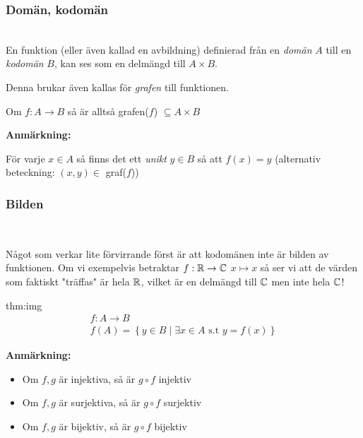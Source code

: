 \subsubsection{Domän, kodomän}\hfill\\
\noindent En funktion (eller även kallad en avbildning) definierad från en \textit{domän} $A$ till en \textit{kodomän} $B$, kan ses som en delmängd till $A\times B$.\par
\noindent Denna brukar även kallas för \textit{grafen} till funktionen.\par
\noindent Om $f:A\to B$ så är alltså grafen($f$) $\subseteq A\times B$ 
\par\bigskip
\noindent\textbf{Anmärkning:}\par
\noindent För varje $x\in A$ så finns det ett \textit{unikt} $y\in B$ så att $f(x) = y$ (alternativ beteckning: $(x,y)\in$ graf($f$))
\par\bigskip
\subsubsection{Bilden}\hfill\\\par
\noindent Något som verkar lite förvirrande först är att kodomänen inte är bilden av funktionen. Om vi exempelvis betraktar $f:\mathbb{R}\to\mathbb{C}$ $x\mapsto x$ så ser vi att de värden som faktiskt "träffas" är hela $\mathbb{R}$, vilket är en delmängd till $\mathbb{C}$ men inte hela $\mathbb{C}$!
\par\bigskip
\begin{theo}{thm:img}
  \begin{equation*}
    \begin{gathered}
      f:A\to B\\
      f(A) = \left\{y\in B\;|\;\exists x\in A\text{ s.t } y=f(x)\right\}
    \end{gathered}
  \end{equation*}
\end{theo}
\par\bigskip
\noindent\textbf{Anmärkning:}\par
\begin{itemize}
  \item Om $f,g$ är injektiva, så är $g\circ f$ injektiv
  \item Om $f,g$ är surjektiva, så är $g\circ f$ surjektiv 
  \item Om $f,g$ är bijektiv, så är $g\circ f$ bijektiv
\end{itemize}
\newpage
